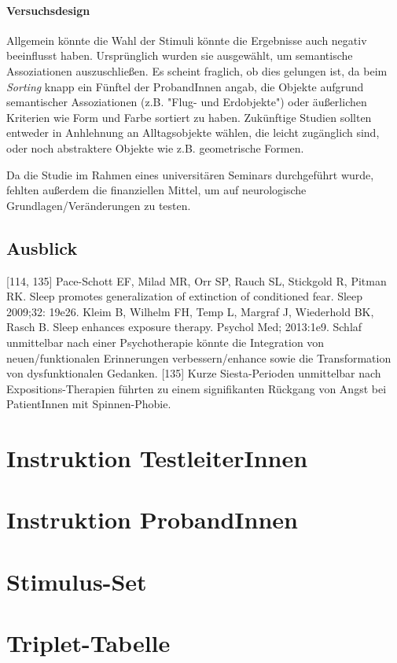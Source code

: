\paragraph{Versuchsdesign}
Allgemein könnte die Wahl der Stimuli könnte die Ergebnisse auch negativ beeinflusst haben. Ursprünglich wurden sie ausgewählt, um semantische Assoziationen auszuschließen. Es scheint fraglich, ob dies gelungen ist, da beim \textit{Sorting} knapp ein Fünftel der ProbandInnen angab, die Objekte aufgrund semantischer Assoziationen (z.B. "Flug- und Erdobjekte") oder äußerlichen Kriterien wie Form und Farbe sortiert zu haben. Zukünftige Studien sollten entweder in Anhlehnung an \citet{Garvert2017} Alltagsobjekte wählen, die leicht zugänglich sind, oder noch abstraktere Objekte wie z.B. geometrische Formen. 

Da die Studie im Rahmen eines universitären Seminars durchgeführt wurde, fehlten außerdem die finanziellen Mittel, um auf neurologische Grundlagen/Veränderungen zu testen.


\subsection{Ausblick}
[114, 135]
Pace-Schott EF, Milad MR, Orr SP, Rauch SL, Stickgold R, Pitman RK. Sleep promotes generalization of extinction of conditioned fear. Sleep 2009;32: 19e26.
Kleim B, Wilhelm FH, Temp L, Margraf J, Wiederhold BK, Rasch B. Sleep enhances exposure therapy. Psychol Med; 2013:1e9.
Schlaf unmittelbar nach einer Psychotherapie könnte die Integration von neuen/funktionalen Erinnerungen verbessern/enhance sowie die Transformation von dysfunktionalen Gedanken.
[135] Kurze Siesta-Perioden unmittelbar nach Expositions-Therapien führten zu einem signifikanten Rückgang von Angst bei PatientInnen mit Spinnen-Phobie.

\newpage


%


\clearpage
\appendix
{} %
\renewcommand*{\thesection}{\Alph{section}}

\section{Instruktion TestleiterInnen}

\newpage

\section{Instruktion ProbandInnen}

\newpage

\section{Stimulus-Set}

\newpage

\section{Triplet-Tabelle}

\newpage
\clearpage


